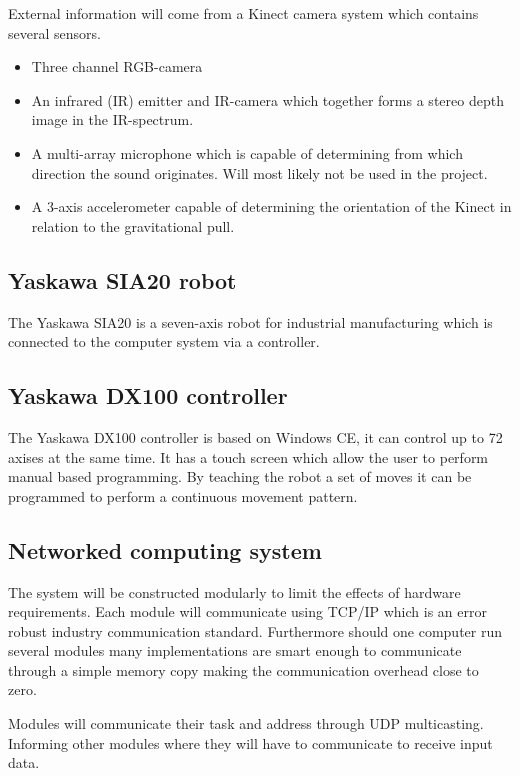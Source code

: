 \documentclass[10pt,a4paper,twocolumn,english]{article}
\begin{document}
External information will come from a Kinect camera system which contains several sensors.\cite{kinectref}

\begin{itemize}
\item Three channel RGB-camera
\item An infrared (IR) emitter and IR-camera which together forms a stereo depth image in the IR-spectrum.
\item A multi-array microphone which is capable of determining from which direction the sound originates. Will most likely not be used in the project.
\item A 3-axis accelerometer capable of determining the orientation of the Kinect in relation to the gravitational pull.
\end{itemize}

\subsection{Yaskawa SIA20 robot}

The Yaskawa SIA20 is a seven-axis robot for industrial manufacturing which is connected to the computer system via a controller.\cite{sia20}

\subsection{Yaskawa DX100 controller}


The Yaskawa DX100 controller is based on Windows CE, it can control up to 72 axises at the same time. It has a touch screen which allow the user to perform manual based programming. By teaching the robot a set of moves it can be programmed to perform a continuous movement pattern.

\subsection{Networked computing system}

The system will be constructed modularly to limit the effects of hardware requirements. Each module will communicate using TCP/IP which is an error robust industry communication standard. Furthermore should one computer run several modules many implementations are smart enough to communicate through a simple memory copy making the communication overhead close to zero.

Modules will communicate their task and address through UDP multicasting. Informing other modules where they will have to communicate to receive input data.
\end{document}
